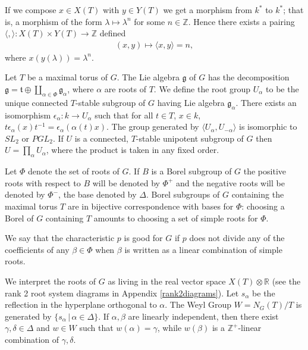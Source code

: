 If we compose $x\in X(T)$ with $y\in Y(T)$ we get a morphism from $k^*$ to $k^*$; that is, a morphism of the form $\lambda\mapsto \lambda^n$ for some $n\in \mathbb{Z}$. Hence there exists a pairing $\langle,\rangle:X(T)\times Y(T)\rightarrow \mathbb{Z}$ defined
\begin{align*}
	(x, y) \mapsto \langle x, y\rangle = n,
\end{align*}
where $x(y(\lambda)) = \lambda^n$. 

Let $T$ be a maximal torus of $G$. The Lie algebra $\mathfrak{g}$ of $G$ has the decomposition $\mathfrak{g} = \mathfrak{t} \oplus \coprod_{\alpha\in\Phi} \mathfrak{g}_\alpha$, where $\alpha$ are roots of $T$. We define the root group $U_\alpha$ to be the unique connected $T$-stable subgroup of $G$ having Lie algebra $\mathfrak{g}_\alpha$. There exists an isomorphism $\epsilon_\alpha: k \rightarrow U_\alpha$ such that for all $t\in T$, $x\in k$, $t\epsilon_\alpha(x)t^{-1} = \epsilon_\alpha(\alpha(t)x)$.
The group generated by $\langle U_\alpha, U_{-\alpha}\rangle$ is isomorphic to $SL_2$ or $PGL_2$. If $U$ is a connected, $T$-stable unipotent subgroup of $G$ then $U=\prod_\alpha U_\alpha$, where the product is taken in any fixed order.

Let $\Phi$ denote the set of roots of $G$. If $B$ is a Borel subgroup of $G$ the positive roots with respect to $B$ will be denoted by $\Phi^+$ and the negative roots will be denoted by $\Phi^-$, the base denoted by $\Delta$. Borel subgroups of $G$ containing the maximal torus $T$ are in bijective correspondence with bases for $\Phi$: choosing a Borel of $G$ containing $T$ amounts to choosing a set of simple roots for $\Phi$.

We say that the characteristic $p$ is good for $G$ if $p$ does not divide any of the coefficients of any $\beta\in\Phi$ when $\beta$ is written as a linear combination of simple roots.

We interpret the roots of $G$ as living in the real vector space $X(T)\otimes \mathbb{R}$ (see the rank 2 root system diagrams in Appendix \ref{rank2diagrams}).
Let $s_\alpha$ be the reflection in the hyperplane orthogonal to $\alpha$. The Weyl Group $W = N_G(T)/T$ is generated by $\{s_\alpha\,|\,\alpha\in \Delta\}$. If $\alpha,\beta$ are linearly independent, then there exist $\gamma,\delta\in \Delta$ and $w\in W$ such that $w(\alpha) = \gamma$, while $w(\beta)$ is a $\mathbb{Z}^+$-linear combination of $\gamma, \delta$.

